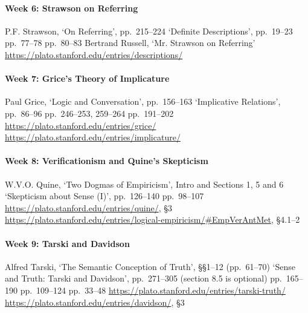 \paragraph{Week 6: Strawson on Referring}
\begin{readings}
  \req P.F. Strawson, `On Referring', pp.\ 215--224
  \req `Definite Descriptions', pp.\ 19--23
  \supp pp.\ 77--78
  \supp pp.\ 80--83
  \supp Bertrand Russell, `Mr. Strawson on Referring'
  \supp \url{https://plato.stanford.edu/entries/descriptions/}
\end{readings}

\paragraph{Week 7: Grice's Theory of Implicature}
\begin{readings}
  \req Paul Grice, `Logic and Conversation', pp.\ 156--163
  \req `Implicative Relations', pp.\ 86--96
  \supp pp.\ 246--253, 259--264
  \supp pp.\ 191--202
  \supp \url{https://plato.stanford.edu/entries/grice/}
  \supp \url{https://plato.stanford.edu/entries/implicature/}
\end{readings}

\paragraph{Week 8: Verificationism and Quine's Skepticism}
\begin{readings}
  \req W.V.O. Quine, `Two Dogmas of Empiricism', Intro and Sections 1, 5 and 6
  \req `Skepticism about Sense (I)', pp.\ 126--140
  \supp pp.\ 98--107
  \supp \url{https://plato.stanford.edu/entries/quine/}, \S3
  \supp \url{https://plato.stanford.edu/entries/logical-empiricism/#EmpVerAntMet}, \S4.1--2
\end{readings}

\paragraph{Week 9: Tarski and Davidson}
\begin{readings}
  \req Alfred Tarski, `The Semantic Conception of Truth', \S\S1--12 (pp.\ 61--70)
  \req `Sense and Truth: Tarski and Davidson', pp.\ 271--305 (section 8.5 is optional)
  \supp pp.\ 165--190
  \supp pp.\ 109--124
  \supp pp.\ 33--48
  \supp \url{https://plato.stanford.edu/entries/tarski-truth/}
  \supp \url{https://plato.stanford.edu/entries/davidson/}, \S3
\end{readings}

